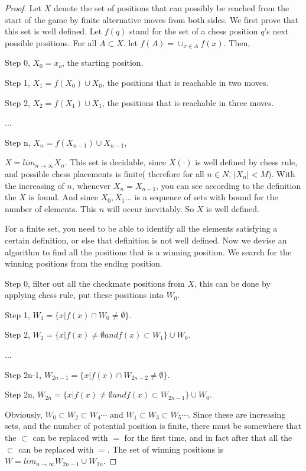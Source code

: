 \begin{proof}

Let $X$ denote the set of positions that can possibly be reached from
the start of the game by finite alternative moves from both sides. We
first prove that this set is well defined. Let $f(q)$ stand for the
set of a chess position $q$'s next possible positions. For all
$A\subset X$. let $f(A)=\cup_{x\in A}f(x)$. Then,

Step 0, $X_0={x_o}$, the starting position.

Step 1, $X_1=f(X_0)\cup X_0$, the positions that is reachable in two
moves.

Step 2, $X_2=f(X_1)\cup X_1$, the positions that is reachable in three
moves.

...

Step n, $X_n=f(X_{n-1})\cup X_{n-1}$,


$X=lim_{n\rightarrow \infty}X_n$. This set is decidable, since $X(\cdot)$ is well defined by chess rule, and possible chess placements is finite( therefore for all $n \in N$, $|X_n|<M$).
With the increasing of $n$, whenever $X_n=X_{n-1}$, you can see according to the definition the $X$ is found. And since $X_0,X_1...$ is a sequence of sets with bound for the number of elements.
This $n$ will occur inevitably. So $X$ is well defined.

 For a finite set, you need to be able to identify all the elements
 satisfying a certain definition, or else that definition is not well
 defined. Now we devise an algorithm to find all the positions that is
 a winning position. We search for the winning positions from the
 ending position.

Step 0, filter out all the checkmate positions from $X$, this can be
done by applying chess rule, put these positions into $W_0$.

Step 1, $W_1=\{x|f(x)\cap W_0 \not = \emptyset\}$.

Step 2, $W_2=\{x|f(x)\not=\emptyset and f(x)\subset W_1\}\cup W_0$.

...

Step 2n-1, $W_{2n-1}=\{x|f(x)\cap W_{2n-2} \not = \emptyset\}$.

Step 2n, $W_{2n}=\{x|f(x) \not=\emptyset and f(x)\subset W_{2n-1}\}\cup W_0$.

Obviously,  $W_0 \subset W_2 \subset W_4 \cdots$ and $W_1 \subset W_3
\subset W_5 \cdots$. Since these are increasing sets, and the number
of potential position is finite, there must be somewhere that the
$\subset$ can be replaced with $=$ for the first time, and in fact
after that all the $\subset$ can be replaced with $=$. The set of
winning positions is $W=lim_{n\rightarrow\infty} W_{2n-1}\cup W_{2n}$.

\end{proof} 

